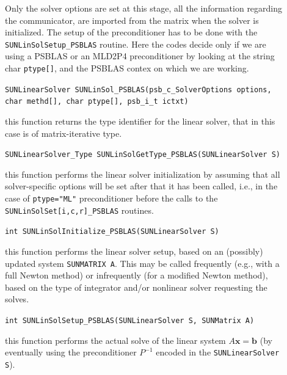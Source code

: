 \documentclass[twoside,a4paper]{refart}
\theoremstyle{definition}
\begin{document}
\begin{description}

\item[] Only the solver options are set at this stage, all the information regarding the communicator, are imported from the matrix when the solver is initialized. The setup of the preconditioner has to be done with the \lstinline[style=CStyle]|SUNLinSolSetup_PSBLAS| routine. Here the codes decide only if we are using a PSBLAS or an MLD2P4 preconditioner by looking at the string char \lstinline[style=CStyle]|ptype[]|, and the PSBLAS contex on which we are working.
	
 \lstinline[style=CStyle]|SUNLinearSolver SUNLinSol_PSBLAS(psb_c_SolverOptions options, char methd[], char ptype[], psb_i_t ictxt)|

\item[] this function returns the type identifier for the linear solver, that in this case is of matrix-iterative type.

 \lstinline[style=CStyle]|SUNLinearSolver_Type SUNLinSolGetType_PSBLAS(SUNLinearSolver S)|

\item[] this function performs the linear solver initialization by assuming that all solver-specific options will be set after that it has been called, i.e., in the case of \lstinline[style=CStyle]|ptype="ML"| preconditioner before the calls to the \texttt{SUNLinSolSet[i,c,r]\_PSBLAS} routines.

 \lstinline[style=CStyle]|int SUNLinSolInitialize_PSBLAS(SUNLinearSolver S)|

\item[] this function performs the linear solver setup, based on an (possibly) updated system \lstinline[style=CStyle]|SUNMATRIX A|. This may be called frequently (e.g., with a full
Newton method) or infrequently (for a modified Newton method), based on the type of
integrator and/or nonlinear solver requesting the solves.

 \lstinline[style=CStyle]|int SUNLinSolSetup_PSBLAS(SUNLinearSolver S, SUNMatrix A)|

\item[] this function performs the actual solve of the linear system $A\mathbf{x} = \mathbf{b}$ (by eventually using the preconditioner $P^{-1}$ encoded in the \lstinline[style=CStyle]|SUNLinearSolver S|).


\end{description}
\end{document}
